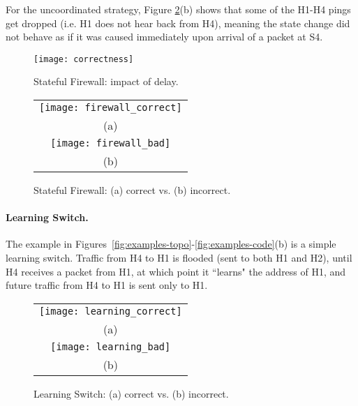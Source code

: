 \documentclass[pldi-cameraready]{sigplanconf}
\begin{document}
For the uncoordinated strategy, Figure \ref{fig:firewall_correct}(b) shows that
some of the H1-H4 pings get dropped (i.e. H1 does not hear back from H4), meaning the
state change did not behave as if it was caused immediately upon arrival of a packet at S4.

\begin{figure}[b]
\centering
\texttt{[image: correctness]}
\caption{Stateful Firewall: impact of delay.}
\label{fig:firewall_correct_corr}
\end{figure}


\begin{figure}[t]
\centering
\bgroup
\def\arraystretch{0.5}
\begin{tabular}{c}
\texttt{[image: firewall\_correct]} \\
{\scriptsize (a)} \\
\texttt{[image: firewall\_bad]} \\
{\scriptsize (b)}
\end{tabular}
\egroup
\caption{Stateful Firewall: (a) correct vs. (b) incorrect.}
\label{fig:firewall_correct}
\end{figure}



\paragraph{Learning Switch.} The example in Figures~\ref{fig:examples-topo}-\ref{fig:examples-code}(b)
is a simple learning switch. Traffic from H4 to H1 is flooded (sent
to both H1 and H2), until H4 receives a packet from H1, at which
point it ``learns" the address of H1,
and future traffic from H4 to H1 is sent only to H1.

\begin{figure}[b]
\centering
\bgroup
\def\arraystretch{0.5}
\begin{tabular}{c}
\texttt{[image: learning\_correct]} \\
{\scriptsize (a)} \\
\texttt{[image: learning\_bad]} \\
{\scriptsize (b)}
\end{tabular}
\egroup
\caption{Learning Switch: (a) correct vs. (b) incorrect.}
\label{fig:learning_correct}
\end{figure}
\end{document}
